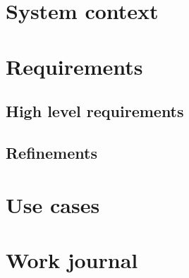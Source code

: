 \documentclass[a4paper]{article}
\begin{document}
\section{System context}



\section{Requirements}

\subsection{High level requirements}


\subsection{Refinements}



\section{Use cases}




\section{Work journal}
\end{document}
